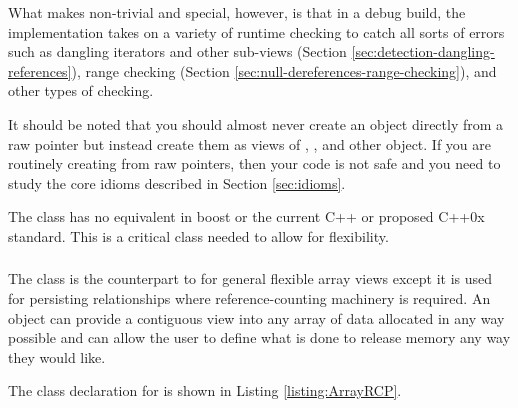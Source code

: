 \documentclass[pdf,ps2pdf,11pt]{SANDreport}
\begin{document}
What makes {} non-trivial and special, however, is
that in a debug build, the implementation takes on a variety of
runtime checking to catch all sorts of errors such as dangling
iterators and other sub-views (Section
{}\ref{sec:detection-dangling-references}), range checking (Section
{}\ref{sec:null-dereferences-range-checking}), and other types of
checking.

It should be noted that you should almost never create an
{} object directly from a raw pointer but instead
create them as views of {}, {},
{} and other {} object.  If you are
routinely creating {} from raw pointers, then your
code is not safe and you need to study the core idioms described in
Section {}\ref{sec:idioms}.

The class {} has no equivalent in boost or the
current C++ or proposed C++0x standard.  This is a critical class
needed to allow for flexibility.


%
{}\subsubsection{}
\label{sec:ArrayRCP}
%

The class {} is the counterpart to
{} for general flexible array views except it is
used for persisting relationships where reference-counting machinery
is required.  An {} object can provide a contiguous
view into any array of data allocated in any way possible and can
allow the user to define what is done to release memory any way they
would like.

The class declaration for {} is shown in
Listing {}\ref{listing:ArrayRCP}.
\end{document}

